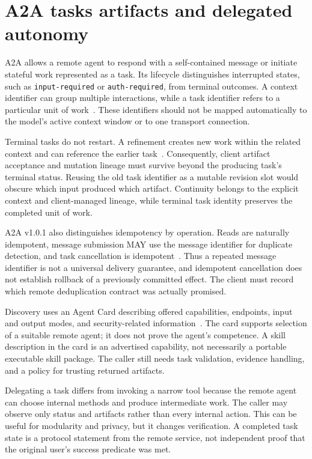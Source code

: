 \section{A2A tasks artifacts and delegated autonomy}\label{sec:C19:a2a}
A2A allows a remote agent to respond with a self-contained message or initiate stateful work represented as a task. Its lifecycle distinguishes interrupted states, such as \texttt{input-required} or \texttt{auth-required}, from terminal outcomes. A context identifier can group multiple interactions, while a task identifier refers to a particular unit of work~\cite{a2a2026task}. These identifiers should not be mapped automatically to the model's active context window or to one transport connection.

Terminal tasks do not restart. A refinement creates new work within the related context and can reference the earlier task~\cite{a2a2026task}. Consequently, client artifact acceptance and mutation lineage must survive beyond the producing task's terminal status. Reusing the old task identifier as a mutable revision slot would obscure which input produced which artifact. Continuity belongs to the explicit context and client-managed lineage, while terminal task identity preserves the completed unit of work.

A2A v1.0.1 also distinguishes idempotency by operation. Reads are naturally idempotent, message submission MAY use the message identifier for duplicate detection, and task cancellation is idempotent~\cite{cumb2026a2aspec101}. Thus a repeated message identifier is not a universal delivery guarantee, and idempotent cancellation does not establish rollback of a previously committed effect. The client must record which remote deduplication contract was actually promised.

Discovery uses an Agent Card describing offered capabilities, endpoints, input and output modes, and security-related information~\cite{cumb2026a2adiscovery101}. The card supports selection of a suitable remote agent; it does not prove the agent's competence. A skill description in the card is an advertised capability, not necessarily a portable executable skill package. The caller still needs task validation, evidence handling, and a policy for trusting returned artifacts.

Delegating a task differs from invoking a narrow tool because the remote agent can choose internal methods and produce intermediate work. The caller may observe only status and artifacts rather than every internal action. This can be useful for modularity and privacy, but it changes verification. A completed task state is a protocol statement from the remote service, not independent proof that the original user's success predicate was met.

